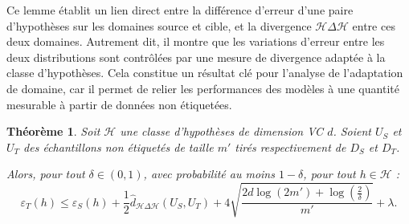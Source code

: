 \documentclass[a4paper,12pt]{article}
\newtheorem{theorem}{Théorème}
\theoremstyle{definition}
\theoremstyle{remark}
\begin{document}
Ce lemme établit un lien direct entre la différence d’erreur d’une paire d’hypothèses sur les domaines source et cible, et la divergence $\mathcal{H}\Delta\mathcal{H}$ entre ces deux domaines. Autrement dit, il montre que les variations d’erreur entre les deux distributions sont contrôlées par une mesure de divergence adaptée à la classe d’hypothèses. Cela constitue un résultat clé pour l’analyse de l’adaptation de domaine, car il permet de relier les performances des modèles à une quantité mesurable à partir de données non étiquetées.\\





\begin{theorem}
Soit $\mathcal{H}$ une classe d'hypothèses de dimension VC $d$.
Soient $U_S$ et $U_T$ des échantillons non étiquetés de taille $m'$ tirés respectivement de $D_S$ et $D_T$.

Alors, pour tout $\delta \in (0,1)$, avec probabilité au moins $1-\delta$, pour tout $h \in \mathcal{H}$ :
\[
\varepsilon_T(h)
\le
\varepsilon_S(h)
+ \frac{1}{2} \hat{d}_{\mathcal{H} \Delta \mathcal{H}}(U_S, U_T)
+ 4 \sqrt{\frac{2d \log(2m') + \log\left(\frac{2}{\delta}\right)}{m'}}
+ \lambda.
\]
\end{theorem}
\end{document}
